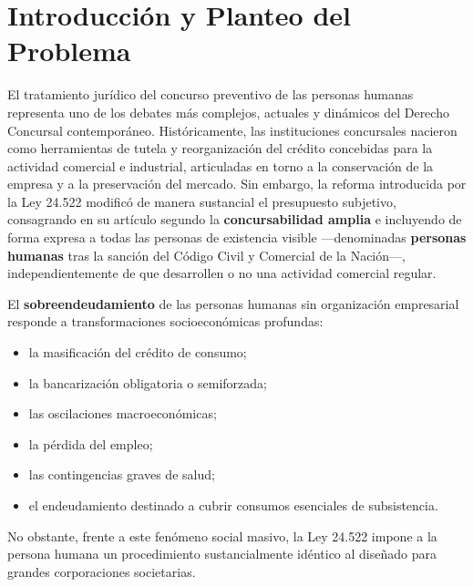 \documentclass[12pt,oneside]{book}
\begin{document}
\tableofcontents


\chapter[Introducción y planteo del problema]{Introducción y Planteo del Problema}

El tratamiento jurídico del concurso preventivo de las personas humanas representa uno de los debates más complejos, actuales y dinámicos del Derecho Concursal contemporáneo. Históricamente, las instituciones concursales nacieron como herramientas de tutela y reorganización del crédito concebidas para la actividad comercial e industrial, articuladas en torno a la conservación de la empresa y a la preservación del mercado. Sin embargo, la reforma introducida por la Ley 24.522 modificó de manera sustancial el presupuesto subjetivo, consagrando en su artículo segundo la \textbf{concursabilidad amplia} e incluyendo de forma expresa a todas las personas de existencia visible ---denominadas \textbf{personas humanas} tras la sanción del Código Civil y Comercial de la Nación---, independientemente de que desarrollen o no una actividad comercial regular.

El \textbf{sobreendeudamiento} de las personas humanas sin organización empresarial responde a transformaciones socioeconómicas profundas:

\begin{itemize}
    \item la masificación del crédito de consumo;
    \item la bancarización obligatoria o semiforzada;
    \item las oscilaciones macroeconómicas;
    \item la pérdida del empleo;
    \item las contingencias graves de salud;
    \item el endeudamiento destinado a cubrir consumos esenciales de subsistencia.
\end{itemize}

No obstante, frente a este fenómeno social masivo, la Ley 24.522 impone a la persona humana un procedimiento sustancialmente idéntico al diseñado para grandes corporaciones societarias.
\end{document}
